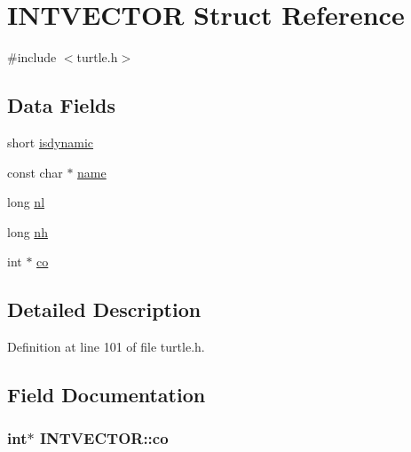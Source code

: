 \hypertarget{struct_i_n_t_v_e_c_t_o_r}{\section{I\-N\-T\-V\-E\-C\-T\-O\-R Struct Reference}
\label{struct_i_n_t_v_e_c_t_o_r}
}


{\ttfamily \#include $<$turtle.\-h$>$}

\subsection*{Data Fields}
\begin{DoxyCompactItemize}
\item 
short \hyperlink{struct_i_n_t_v_e_c_t_o_r_a3b10ef3170cbe7fd5d4ae9d786d690ee}{isdynamic}
\item 
const char $\ast$ \hyperlink{struct_i_n_t_v_e_c_t_o_r_a64f4d970bc5e48da0f3f6b08824b1b2f}{name}
\item 
long \hyperlink{struct_i_n_t_v_e_c_t_o_r_a031c28b900b056db3df8687352e14b18}{nl}
\item 
long \hyperlink{struct_i_n_t_v_e_c_t_o_r_a5409e4977d24b6ba944e47d905079dfc}{nh}
\item 
int $\ast$ \hyperlink{struct_i_n_t_v_e_c_t_o_r_ae01ea23302d443485d2b3447a54986fd}{co}
\end{DoxyCompactItemize}


\subsection{Detailed Description}


Definition at line 101 of file turtle.\-h.



\subsection{Field Documentation}
\hypertarget{struct_i_n_t_v_e_c_t_o_r_ae01ea23302d443485d2b3447a54986fd}{
\subsubsection[{co}]{\setlength{\rightskip}{0pt plus 5cm}int$\ast$ I\-N\-T\-V\-E\-C\-T\-O\-R\-::co}}\label{struct_i_n_t_v_e_c_t_o_r_ae01ea23302d443485d2b3447a54986fd}


